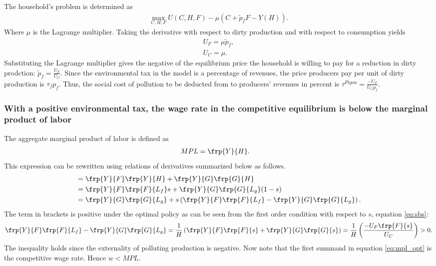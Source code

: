 The household's problem is determined as
\begin{align}
\underset{C,H,F}{\max} U(C,H,F)-\mu \left(C+\tilde{p}_fF-Y(H)\right).
\end{align}
Where $\mu$ is the Lagrange multiplier. Taking the derivative with respect to dirty production  and with respect to consumption yields
\begin{align}
U_F=\mu \tilde{p}_f,\\
U_C=\mu.
\end{align}
Substituting the Lagrange multiplier gives the negative of the equilibrium price the household is willing to pay for a reduction in dirty prodction: $\tilde{p}_f=\frac{U_F}{U_C}$. Since the environmental tax in the model is a percentage of revenues, the price producers pay per unit of dirty production is $\tau_f p_f$. Thus, the social cost of pollution to be deducted from to producers' revenues in percent is $\tau^{Pigou}=\frac{-U_F}{U_Cp_f}$.


\subsubsection{With a positive environmental tax, the wage rate in the competitive equilibrium is below the marginal product of labor}\label{app:wageMPL}

The aggregate marginal product of labor is defined as
\begin{align}
MPL&= \frp{Y}{H}.
\end{align}
This expression can be rewritten using relations of derivatives summarized below as follows.
\begin{align}
&= \frp{Y}{F}\frp{Y}{H}+\frp{Y}{G}\frp{G}{H}\\
&= \frp{Y}{F}\frp{F}{L_f}s+\frp{Y}{G}\frp{G}{L_g}(1-s)\\
&= \frp{Y}{G}\frp{G}{L_g}+ s\left(\frp{Y}{F}\frp{F}{L_f}-\frp{Y}{G}\frp{G}{L_g}\right).\label{eq:mpl_opt}
\end{align}
The term in brackets is positive under the optimal policy as can be seen from the first order condition with respect to $s$, equation \ref{eq:sbs}:
\begin{align}
\frp{Y}{F}\frp{F}{L_f}-\frp{Y}{G}\frp{G}{L_g}=\frac{1}{H}\left(\frp{Y}{F}\frp{F}{s}+\frp{Y}{G}\frp{G}{s}\right)=\frac{1}{H}\left(\frac{-U_F\frp{F}{s}}{U_C}\right)>0.
\end{align}
The inequality holds since the externality of polluting production is negative. %
Now note that the first summand in equation \ref{eq:mpl_opt} is the competitive wage rate.  Hence $w<MPL$.

